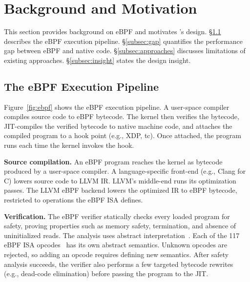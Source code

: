 


\section{Background and Motivation}
\label{sec:background}

This section provides background on eBPF and motivates \lang's design. \S\ref{subsec:ebpf} describes the eBPF execution pipeline. \S\ref{subsec:gap} quantifies the performance gap between eBPF and native code. \S\ref{subsec:approaches} discusses limitations of existing approaches. \S\ref{subsec:insight} states the design insight.

\subsection{The eBPF Execution Pipeline}
\label{subsec:ebpf}

Figure~\ref{fig:ebpf} shows the eBPF execution pipeline. A user-space compiler compiles source code to eBPF bytecode. The kernel then verifies the bytecode, JIT-compiles the verified bytecode to native machine code, and attaches the compiled program to a hook point (e.g., XDP, tc). Once attached, the program runs each time the kernel invokes the hook.



\noindent\textbf{Source compilation.}
An eBPF program reaches the kernel as bytecode produced by a user-space compiler. A language-specific front-end (e.g., Clang for C) lowers source code to LLVM IR. LLVM's middle-end runs its optimization passes. The LLVM eBPF backend lowers the optimized IR to eBPF bytecode, restricted to operations the eBPF ISA defines.

\noindent\textbf{Verification.}
The eBPF verifier statically checks every loaded program for safety, proving properties such as memory safety, termination, and absence of uninitialized reads. The analysis uses abstract interpretation~\cite{gershuni2019simple}. Each of the 117 eBPF ISA opcodes~\cite{rfc9669} has its own abstract semantics. Unknown opcodes are rejected, so adding an opcode requires defining new semantics. After safety analysis succeeds, the verifier also performs a few targeted bytecode rewrites (e.g., dead-code elimination) before passing the program to the JIT.


